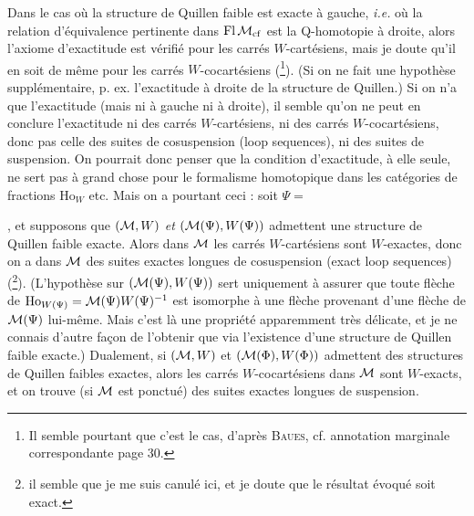 Dans le cas où la structure de Quillen faible est exacte à gauche, \textit{i.e.} où la relation d'équivalence pertinente dans $\mathrm{Fl}\,\mathcal{M}_{\mathrm{cf}}$ est la Q-homotopie à droite, alors l'axiome d'exactitude est vérifié pour les carrés $W$-cartésiens, mais je doute qu'il en soit de même pour les carrés $W$-cocartésiens (\footnote{Il semble pourtant que c'est le cas, d'après \textsc{Baues}, cf. annotation marginale correspondante page 30.}). (Si on ne fait une hypothèse supplémentaire, p. ex. l'exactitude à droite de la structure de Quillen.) Si on n'a que l'exactitude (mais ni à gauche ni à droite), il semble qu'on ne peut en conclure l'exactitude ni des carrés $W$-cartésiens, ni des carrés $W$-cocartésiens, donc pas celle des suites de cosuspension (loop sequences), ni des suites de suspension. On pourrait donc penser que la condition d'exactitude, à elle seule, ne sert pas à grand
chose pour le formalisme homotopique dans les catégories de fractions $\mathrm{Ho}_W$ etc. Mais on a pourtant ceci : soit $\Psi = {}$, et supposons que $(\mathcal{M},W)$ \textit{et} $(\mathcal{M}(\Psi),W(\Psi))$ 
 admettent une structure de Quillen faible exacte. Alors dans $\mathcal{M}$ les carrés $W$-cartésiens sont $W$-exactes, donc on a dans $\mathcal{M}$ des suites exactes longues de cosuspension (exact loop sequences) (\footnote{il semble que je me suis canulé ici, et je doute que le résultat évoqué soit exact.}). (L'hypothèse sur $(\mathcal{M}(\Psi),W(\Psi))$ sert uniquement à assurer que toute flèche de $\mathrm{Ho}_{W(\Psi)} = \mathcal{M}(\Psi)W(\Psi)^{-1}$ est isomorphe à une flèche provenant d'une flèche de $\mathcal{M}(\Psi)$ lui-même. Mais c'est là une propriété apparemment très délicate, et je ne connais d'autre façon de l'obtenir que via l'existence d'une structure de Quillen faible exacte.) Dualement, si $(\mathcal{M},W)$ et $(\mathcal{M}(\Phi),W(\Phi))$ admettent des structures de Quillen faibles exactes, alors les carrés $W$-cocartésiens dans $\mathcal{M}$ sont $W$-exacts, et on trouve (si $\mathcal{M}$ est ponctué) des suites exactes longues de suspension. %

